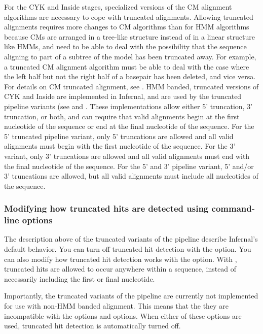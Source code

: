 \begin{sreoutput}
For the CYK and Inside stages, specialized versions of the CM
alignment algorithms are necessary to cope with truncated
alignments. Allowing truncated alignments requires more changes to CM
algorithms than for HMM algorithms because CMs are arranged in a
tree-like structure instead of in a linear structure like HMMs, and
need to be able to deal with the possibility that the sequence
aligning to part of a subtree of the model has been truncated
away. For example, a truncated CM alignment algorithm must be able to
deal with the case where the left half but not the right half of a
basepair has been deleted, and vice versa. For details on CM truncated
alignment, see \citep{KolbeEddy08}. HMM banded, truncated versions of
CYK and Inside are implemented in Infernal, and are used by the
truncated pipeline variants (see  and
. These implementations allow either 5'
truncation, 3' truncation, or both, and can require that valid
alignments begin at the first nucleotide of the sequence or end at the
final nucleotide of the sequence.  For the 5' truncated pipeline
variant, only 5' truncations are allowed and all valid alignments must
begin with the first nucleotide of the sequence. For the 3' variant,
only 3' truncations are allowed and all valid alignments must end with
the final nucleotide of the sequence. For the 5' and 3' pipeline
variant, 5' and/or 3' truncations are allowed, but all valid
alignments must include all nucleotides of the sequence.


\subsubsection{Modifying how truncated hits are detected using
  command-line options}

The description above of the truncated variants of the pipeline
describe Infernal's default behavior. You can turn off truncated hit
detection with the  option. You can also modify how 
truncated hit detection works with the  option. With
, truncated hits are allowed to occur anywhere
within a sequence, instead of necessarily including the first or final
nucleotide. 

Importantly, the truncated variants of the pipeline are currently not
implemented for use with non-HMM banded alignment. This means that the
they are incompatible with the  options and
 options. When either of these options are used,
truncated hit detection is automatically turned off.


\end{sreoutput}
